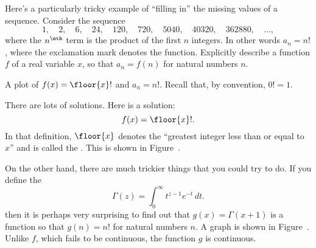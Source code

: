 \begin{example}
  Here's a particularly tricky example of ``filling in'' the missing values of a sequence.  Consider the sequence
  $$
  1,\quad 2,\quad 6,\quad 24,\quad 120,\quad 720,\quad 5040,\quad 40320,\quad 362880,\quad\ldots,
  $$
  where the $n^{\nth}$ term is the product of the first $n$ integers.
  In other words $a_n = n!$, where the exclamation mark denotes the
   function.  Explicitly describe a function $f$
  of a real variable $x$, so that $a_n = f(n)$ for natural numbers
  $n$.
\end{example}

\begin{marginfigure}[0in]
\caption{A plot of $f(x) = \floor{x}!$ and $a_n = n!$.  Recall that, by convention, $0! = 1$.}
\label{fig:floor-graph}
\end{marginfigure}


\begin{solution}
  There are lots of solutions.  Here is a solution:
$$
f(x) = \floor{x}!.
$$
In that definition, $\floor{x}$ denotes the ``greatest integer less
  than or equal to $x$'' and is called the .  This is shown in Figure~.

  On the other hand, there are much trickier things that you could try
  to do.  If you define the 
  $$
  \Gamma(z) = \int_0^\infty t^{z-1} e^{-t} \, dt.
  $$
  then it is perhaps very surprising to find out that $g(x) =
  \Gamma(x+1)$ is a function so that $g(n) = n!$ for natural numbers
  $n$.  A graph is shown in Figure~.
  Unlike $f$, which fails to be continuous, the function $g$ is continuous.
\end{solution}

